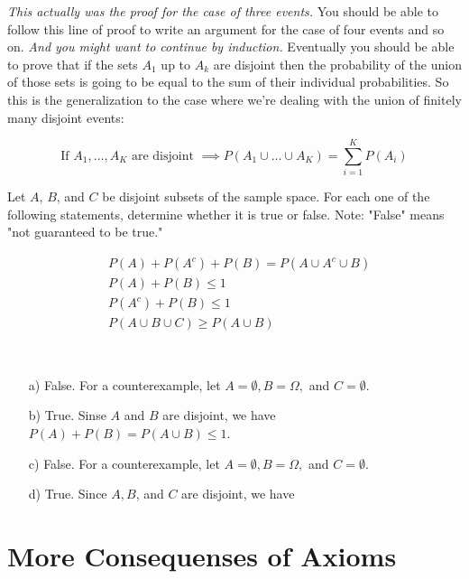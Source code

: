 \documentclass{tufte-handout}
\begin{document}
\textit{This actually was the proof for the case of three events.} You should be able to follow this line of proof to write an
argument for the case of four events and so on. \textit{And you might want to continue by induction.} 
Eventually you should be able to prove that if the sets $A_1$ up to $A_k$ are disjoint then the probability of the
union of those sets is going to be equal to the sum of their individual probabilities. So this is the
generalization to the case where we're dealing with the union of finitely many disjoint events:

$$
\text{If } A_1, \ldots, A_K\text{ are disjoint } \implies P( A_1 \cup \ldots \cup A_K) = \sum_{i = 1}^K P(A_i)
$$



Let $A$, $B$, and $C$ be disjoint subsets of the sample space. For each one of the following statements, determine whether it is true or false. Note: "False" means "not guaranteed to be true."

\begin{align}
&P(A) + P(A^c) + P(B) = P(A \cup A^c \cup B) \\
&P(A) + P(B) \leq 1 \\
&P(A^c) + P(B) \leq 1 \\
&P(A \cup B \cup C) \geq P(A \cup B)
\end{align}

\begin{Answer} \ 
\begin{enumerate}
\item[a)] False. For a counterexample, let $A = \emptyset, B = \Omega,$ and $C = \emptyset$.
\item[b)] True. Sinse $A$ and $B$ are disjoint, we have $P(A) + P(B) = P(A \cup B) \leq 1.$
\item[c)] False. For a counterexample, let $A = \emptyset, B = \Omega,$ and $C = \emptyset$.
\item[d)] True. Since $A, B$, and $C$ are disjoint, we have 
\end{enumerate}
\end{Answer}



\pagebreak
\section{More Consequenses of Axioms}\label{sec:axiom-consequences}
\end{document}
